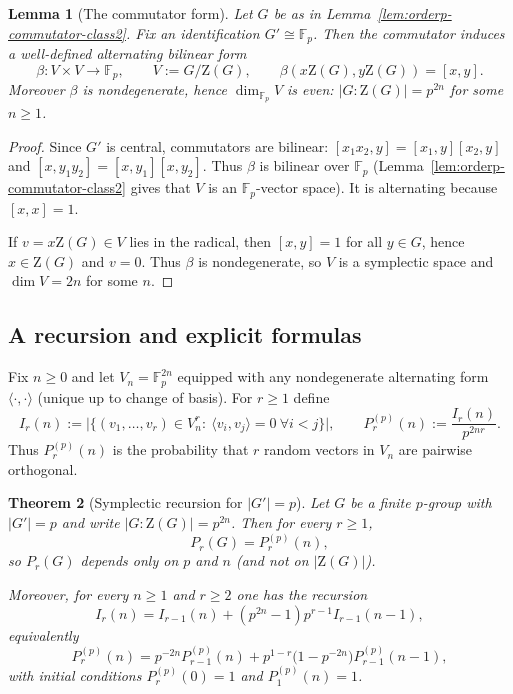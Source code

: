 \documentclass[11pt]{article}
\newtheorem{theorem}{Theorem}[section]
\newtheorem{lemma}[theorem]{Lemma}
\theoremstyle{definition}
\theoremstyle{remark}
\theoremstyle{definition}
\theoremstyle{plain}
\newcommand{\Z}{\mathrm{Z}}
\begin{document}
\begin{lemma}[The commutator form]\label{lem:commutator-symplectic}
Let $G$ be as in Lemma~\ref{lem:orderp-commutator-class2}.
Fix an identification $G'\cong \mathbb F_p$.
Then the commutator induces a well-defined alternating bilinear form
\[
\beta: V\times V\to \mathbb F_p,
\qquad
V:=G/\Z(G),
\qquad
\beta(x\Z(G),y\Z(G))=[x,y].
\]
Moreover $\beta$ is nondegenerate, hence $\dim_{\mathbb F_p}V$ is even:
\(
|G:\Z(G)|=p^{2n}
\)
for some $n\ge 1$.
\end{lemma}

\begin{proof}
Since $G'$ is central, commutators are bilinear:
$[x_1x_2,y]=[x_1,y][x_2,y]$ and $[x,y_1y_2]=[x,y_1][x,y_2]$.
Thus $\beta$ is bilinear over $\mathbb F_p$ (Lemma~\ref{lem:orderp-commutator-class2} gives that $V$ is an $\mathbb F_p$-vector space).
It is alternating because $[x,x]=1$.

If $v=x\Z(G)\in V$ lies in the radical, then $[x,y]=1$ for all $y\in G$, hence $x\in \Z(G)$ and $v=0$.
Thus $\beta$ is nondegenerate, so $V$ is a symplectic space and $\dim V=2n$ for some $n$.
\end{proof}

\subsection{A recursion and explicit formulas}

Fix $n\ge 0$ and let $V_n=\mathbb F_p^{2n}$ equipped with any nondegenerate alternating form
$\langle\cdot,\cdot\rangle$ (unique up to change of basis).
For $r\ge 1$ define
\[
I_r(n):=\big|\{(v_1,\dots,v_r)\in V_n^r:\ \langle v_i,v_j\rangle=0\ \forall i<j\}\big|,
\qquad
P_r^{(p)}(n):=\frac{I_r(n)}{p^{2nr}}.
\]
Thus $P_r^{(p)}(n)$ is the probability that $r$ random vectors in $V_n$ are pairwise orthogonal.

\begin{theorem}[Symplectic recursion for \texorpdfstring{$|G'|=p$}{|G'|=p}]\label{thm:symplectic-recursion}
Let $G$ be a finite $p$-group with $|G'|=p$ and write $|G:\Z(G)|=p^{2n}$.
Then for every $r\ge 1$,
\[
P_r(G)=P_r^{(p)}(n),
\]
so $P_r(G)$ depends only on $p$ and $n$ (and not on $|\Z(G)|$).

Moreover, for every $n\ge 1$ and $r\ge 2$ one has the recursion
\[
I_r(n)=I_{r-1}(n)+(p^{2n}-1)p^{r-1}I_{r-1}(n-1),
\]
equivalently
\[
P_r^{(p)}(n)=p^{-2n}P_{r-1}^{(p)}(n)+p^{1-r}\bigl(1-p^{-2n}\bigr)P_{r-1}^{(p)}(n-1),
\]
with initial conditions $P_r^{(p)}(0)=1$ and $P_1^{(p)}(n)=1$.
\end{theorem}
\end{document}

